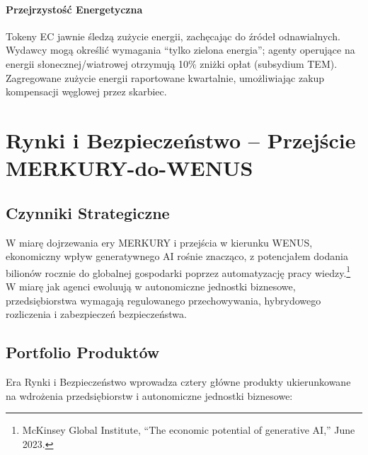 \documentclass[11pt]{article}
\begin{document}
\paragraph{Przejrzystość Energetyczna} Tokeny EC jawnie śledzą zużycie energii, zachęcając do źródeł odnawialnych. Wydawcy mogą określić wymagania ``tylko zielona energia''; agenty operujące na energii słonecznej/wiatrowej otrzymują 10\% zniżki opłat (subsydium TEM). Zagregowane zużycie energii raportowane kwartalnie, umożliwiając zakup kompensacji węglowej przez skarbiec.

\section{Rynki i Bezpieczeństwo -- Przejście MERKURY-do-WENUS}
\subsection{Czynniki Strategiczne}
W miarę dojrzewania ery MERKURY i przejścia w kierunku WENUS, ekonomiczny wpływ generatywnego AI rośnie znacząco, z potencjałem dodania bilionów rocznie do globalnej gospodarki poprzez automatyzację pracy wiedzy.\footnote{McKinsey Global Institute, ``The economic potential of generative AI,'' June 2023.} W miarę jak agenci ewoluują w autonomiczne jednostki biznesowe, przedsiębiorstwa wymagają regulowanego przechowywania, hybrydowego rozliczenia i zabezpieczeń bezpieczeństwa.

\subsection{Portfolio Produktów}
Era Rynki i Bezpieczeństwo wprowadza cztery główne produkty ukierunkowane na wdrożenia przedsiębiorstw i autonomiczne jednostki biznesowe:
\end{document}
